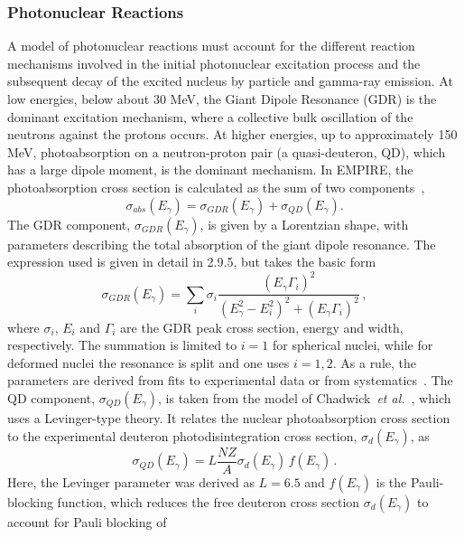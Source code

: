 \documentclass[twocolumn,amsmath,amssymb,10pt,groupedaddress,a4paper]{revtex4}
\begin{document}
\subsubsection{\label{sec:photonuclear} Photonuclear Reactions}
A model of photonuclear reactions must account for the different reaction
mechanisms involved in the initial photonuclear excitation process
and the subsequent decay of the excited nucleus by particle and gamma-ray
emission. At low energies, below about 30 MeV, the Giant Dipole Resonance
(GDR) is the dominant excitation mechanism, where a collective bulk
oscillation of the neutrons against the protons occurs. At higher
energies, up to approximately 150 MeV, photoabsorption on a neutron-proton
pair (a quasi-deuteron, QD), which has a large dipole moment, is the
dominant mechanism.
In EMPIRE, the photoabsorption cross section is calculated as the
sum of two components~\cite{PHNuc},
\begin{equation}
\sigma_{abs}(E_{\gamma})=\sigma_{GDR}(E_{\gamma})+\sigma_{QD}(E_{\gamma}).
\end{equation}
The GDR component, $\sigma_{GDR}(E_{\gamma})$, is given by a Lorentzian
shape, with parameters describing the total absorption of the giant
dipole resonance. The expression used is given in detail in 2.9.5,
but takes the basic form
\begin{equation}
\sigma_{GDR}(E_{\gamma})=\sum_{i}\sigma_{i}\frac{(E_{\gamma}\Gamma_{i})^{2}}{(E_{\gamma}^{2}-E_{i}^{2})^{2}+(E_{\gamma}\Gamma_{i})^{2}}\,,
\end{equation}
\noindent where $\sigma_{i}$, $E_{i}$ and $\Gamma_{i}$ are the GDR peak cross
section, energy and width, respectively. The summation is limited
to $i=1$ for spherical nuclei, while for deformed nuclei the resonance
is split and one uses $i=1,2$. As a rule, the parameters are derived
from fits to experimental data or from systematics~\cite{RIPL2}.
The QD component, $\sigma_{QD}(E_{\gamma})$, is taken from the model
of Chadwick~\emph{et al.}~\cite{chadQD}, which uses a Levinger-type
theory. It relates the nuclear photoabsorption cross section to the
experimental deuteron photodisintegration cross section, $\sigma_{d}(E_{\gamma})$,
as
\begin{equation}
\sigma_{QD}(E_{\gamma})=L\frac{NZ}{A}\sigma_{d}(E_{\gamma})\, f(E_{\gamma})\,.
\end{equation}
Here, the Levinger parameter was derived as $L=6.5$ and $f(E_{\gamma})$
is the Pauli-blocking function, which reduces the free deuteron cross
section $\sigma_{d}(E_{\gamma})$ to account for Pauli blocking of
\end{document}
